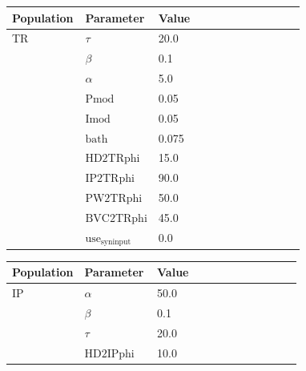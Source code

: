 \documentclass{article}
\begin{document}
\noindent
\begin{tabularx}{\linewidth}{|p{0.25\linewidth}|p{0.25\linewidth}|X|}\hline
\textbf{Population} & \textbf{Parameter} & \textbf{Value}   \\ \hline

    TR             & $\tau$        & 20.0  \\ \hline

                 & $\beta$        & 0.1  \\ \hline

                 & $\alpha$        & 5.0  \\ \hline

                 & ${\text{Pmod}}$        & 0.05  \\ \hline

                 & ${\text{Imod}}$        & 0.05  \\ \hline

                 & ${\text{bath}}$        & 0.075  \\ \hline

                 & ${\text{HD2TRphi}}$        & 15.0  \\ \hline

                 & ${\text{IP2TRphi}}$        & 90.0  \\ \hline

                 & ${\text{PW2TRphi}}$        & 50.0  \\ \hline

                 & ${\text{BVC2TRphi}}$        & 45.0  \\ \hline

                 & ${\text{use}}_{\text{syninput}}$        & 0.0  \\ \hline

\end{tabularx}

\vspace{2ex}

\noindent
\begin{tabularx}{\linewidth}{|p{0.25\linewidth}|p{0.25\linewidth}|X|}\hline
\textbf{Population} & \textbf{Parameter} & \textbf{Value}   \\ \hline

    IP             & $\alpha$        & 50.0  \\ \hline

                 & $\beta$        & 0.1  \\ \hline

                 & $\tau$        & 20.0  \\ \hline

                 & ${\text{HD2IPphi}}$        & 10.0  \\ \hline

\end{tabularx}
\end{document}
